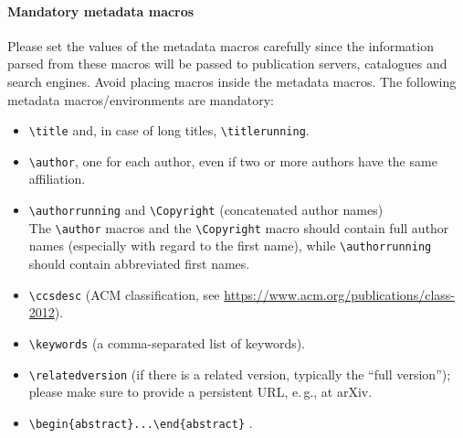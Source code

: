 \documentclass[a4paper,UKenglish,cleveref, autoref, thm-restate]{lipics-v2021}
\begin{document}
\paragraph*{Mandatory metadata macros}
Please set the values of the metadata macros carefully since the information parsed from these macros will be passed to publication servers, catalogues and search engines.
Avoid placing macros inside the metadata macros. The following metadata macros/environments are mandatory:
\begin{itemize}
\item \verb+\title+ and, in case of long titles, \verb+\titlerunning+.
\item \verb+\author+, one for each author, even if two or more authors have the same affiliation.
\item \verb+\authorrunning+ and \verb+\Copyright+ (concatenated author names)\\
The \verb+\author+ macros and the \verb+\Copyright+ macro should contain full author names (especially with regard to the first name), while \verb+\authorrunning+ should contain abbreviated first names.
\item \verb+\ccsdesc+ (ACM classification, see \url{https://www.acm.org/publications/class-2012}).
\item \verb+\keywords+ (a comma-separated list of keywords).
\item \verb+\relatedversion+ (if there is a related version, typically the ``full version''); please make sure to provide a persistent URL, e.\,g., at arXiv.
\item \verb+\begin{abstract}...\end{abstract}+ .
\end{itemize}
\end{document}

